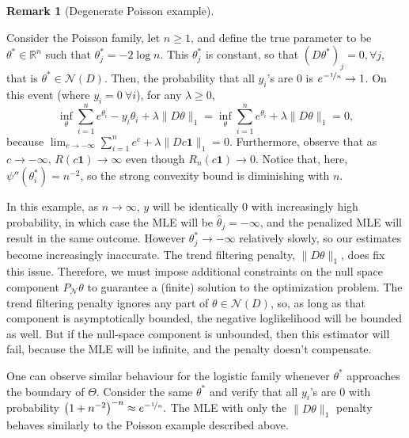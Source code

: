 \documentclass[ejs,noshowframe]{imsart}
\theoremstyle{plain}
\theoremstyle{definition}
\newtheorem*{remark}{Remark}
\newcommand{\R}{\mathbb{R}}
\newcommand{\one}{\mathbf{1}}
\renewcommand{\hat}{\widehat}
\begin{document}
\begin{remark}[Degenerate Poisson example]
	\label{prop:pois_degen}
	
	Consider the Poisson family, let $n\geq 1$, and define the true parameter to
	be $\theta^* \in \R^n$ such that $\theta^*_j = -2\log n$. This $\theta_j^*$ is
	constant, so that $(D\theta^*)_j = 0, \forall j$, that is $\theta^* \in
	\mathcal{N}(D)$. Then, the probability that all $y_i$'s are $0$ is
	$e^{-\nicefrac{1}{n}}\rightarrow 1$. On this event (where $y_i =0\ \forall i$), for any
	$\lambda \geq 0$,
	$$\inf_{\theta} \sum_{i=1}^n e^{\theta_i} -y_i\theta_i+ \lambda \|D\theta\|_1 
	= 
	\inf_{\theta} \sum_{i=1}^n e^{\theta_i} + \lambda \|D\theta\|_1 = 0,$$
	because
	$\lim_{c\rightarrow -\infty} \sum_{i=1}^n e^{c} + \lambda \|Dc \one \|_1  = 
	0$.
	Furthermore,  observe that as $c\rightarrow -\infty$,
	$R(c\one) \rightarrow \infty$ even though $R_n(c\one) \rightarrow 0.$
  Notice that, here, $\psi''(\theta^*_i) = n^{-2}$, so the strong 
	convexity bound is diminishing with $n$. 
  
  In this example, as $n\rightarrow\infty$, $y$ will be identically 0 with
	increasingly high probability, in which case the MLE will be
	$\hat\theta_j=-\infty$, and the penalized MLE will result in the same outcome.
	However $\theta^*_j \rightarrow -\infty$ relatively slowly, so our estimates
	become increasingly inaccurate. The trend filtering penalty, $\| D \theta \|_1$, does
	fix this issue. Therefore, we must
	impose additional constraints on the null space component $P_\mathcal{N}
	\theta$ to guarantee a (finite) solution to the optimization problem. The trend
	filtering penalty ignores any part of $\theta \in \mathcal{N}(D)$, so, as long
	as that component is asymptotically bounded, the negative loglikelihood will
	be bounded as well. But if the null-space component is unbounded, then this
	estimator will fail, because the MLE will be infinite, and the penalty doesn't
	compensate.

\end{remark}

One can observe similar behaviour for the logistic family whenever $\theta^*$
approaches the boundary of $\Theta$. Consider the same
$\theta^*$ and verify that all $y_i$'s are $0$ with probability $\big(1 + n^{-2}
\big)^{-n} \approx e^{-\nicefrac{1}{n}}.$ The MLE with only the $\|D\theta\|_1$
penalty behaves similarly to the Poisson example described above.
\end{document}
